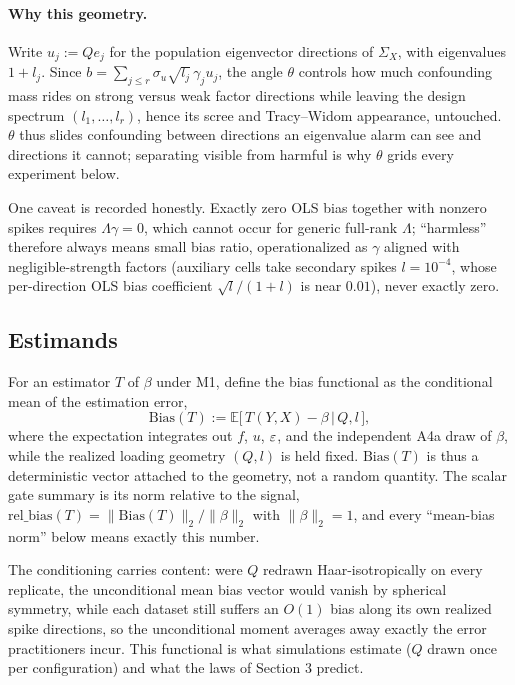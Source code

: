 \paragraph{Why this geometry.}
Write $u_j := Qe_j$ for the population eigenvector directions of $\Sigma_X$, with eigenvalues $1 + l_j$. Since $b = \sum_{j \le r} \sigma_u\sqrt{l_j}\,\gamma_j u_j$, the angle $\theta$ controls how much confounding mass rides on strong versus weak factor directions while leaving the design spectrum $(l_1,\dots,l_r)$, hence its scree and Tracy--Widom appearance, untouched. $\theta$ thus slides confounding between directions an eigenvalue alarm can see and directions it cannot; separating visible from harmful is why $\theta$ grids every experiment below.

One caveat is recorded honestly. Exactly zero OLS bias together with nonzero spikes requires $\Lambda\gamma = 0$, which cannot occur for generic full-rank $\Lambda$; ``harmless'' therefore always means small bias ratio, operationalized as $\gamma$ aligned with negligible-strength factors (auxiliary cells take secondary spikes $l = 10^{-4}$, whose per-direction OLS bias coefficient $\sqrt{l}/(1+l)$ is near $0.01$), never exactly zero.

\subsection{Estimands}
\label{subsec:estimands}

\begin{definition}
\label{def:bias}
For an estimator $T$ of $\beta$ under M1, define the bias functional as the conditional mean of the estimation error,
\[
\mathrm{Bias}(T) := \mathbb{E}\bigl[\,T(Y,X) - \beta \,\big|\, Q, l\,\bigr],
\]
where the expectation integrates out $f$, $u$, $\varepsilon$, and the independent A4a draw of $\beta$, while the realized loading geometry $(Q,l)$ is held fixed. $\mathrm{Bias}(T)$ is thus a deterministic vector attached to the geometry, not a random quantity. The scalar gate summary is its norm relative to the signal,
$\mathrm{rel\_bias}(T) = \|\mathrm{Bias}(T)\|_2 / \|\beta\|_2$
with $\|\beta\|_2=1$, and every ``mean-bias norm'' below means exactly this number.
\end{definition}

The conditioning carries content: were $Q$ redrawn Haar-isotropically on every replicate, the unconditional mean bias vector would vanish by spherical symmetry, while each dataset still suffers an $O(1)$ bias along its own realized spike directions, so the unconditional moment averages away exactly the error practitioners incur. This functional is what simulations estimate ($Q$ drawn once per configuration) and what the laws of Section 3 predict.

